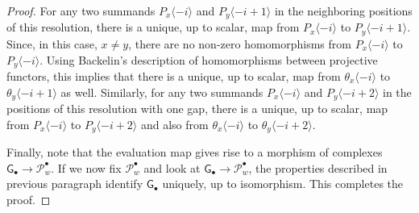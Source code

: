 \documentclass[a4paper]{amsart}
\begin{document}
\begin{proof}

For any two summands $P_x\langle -i\rangle$ and $P_y\langle -i+1\rangle$   in the 
neighboring positions of this resolution, there is a unique, up to scalar, map
from $P_x\langle -i\rangle$ to $P_y\langle -i+1\rangle$. Since,  in this case, $x\neq y$,
there are no non-zero homomorphisms from $P_x\langle -i\rangle$ to $P_y\langle -i\rangle$. 
Using Backelin's description of homomorphisms between projective functors, 
this implies that there is a unique, up to scalar, map
from $\theta_x\langle -i\rangle$ to $\theta_y\langle -i+1\rangle$ as well.
Similarly, for any two summands $P_x\langle -i\rangle$ and $P_y\langle -i+2\rangle$ 
in the positions of this resolution with one gap, there is a unique, up to scalar, map
from $P_x\langle -i\rangle$ to $P_y\langle -i+2\rangle$ and also 
from $\theta_x\langle -i\rangle$ to $\theta_y\langle -i+2\rangle$.

Finally, note that the evaluation map gives rise to a morphism of complexes
$\mathsf{G}_\bullet\to \mathcal{P}^\bullet_w$. If we now fix $\mathcal{P}^\bullet_w$
and look at $\mathsf{G}_\bullet\to \mathcal{P}^\bullet_w$, the properties described in previous 
paragraph identify $\mathsf{G}_\bullet$ uniquely, up to isomorphism. This completes the proof.
\end{proof}
\end{document}
